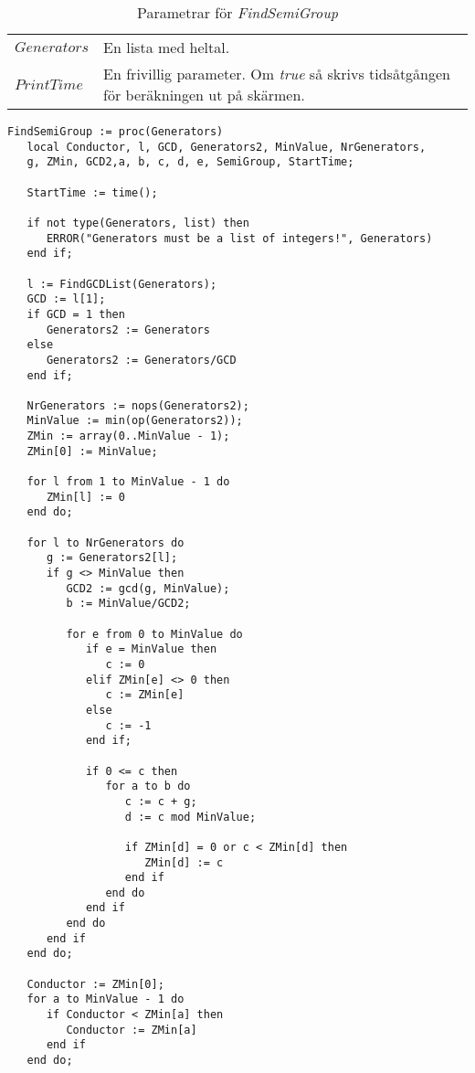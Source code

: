 \begin{table}[h]
\caption{Parametrar för \emph{FindSemiGroup}}
\begin{center}
\begin{tabular}{|l|p{9cm}|}
\hline
$Generators$ & En lista med heltal.\\
$PrintTime$ & En frivillig parameter. Om \emph{true} så skrivs tidsåtgången för beräkningen ut på skärmen.\\
\hline
\end{tabular}
\end{center}
\end{table}

\begin{verbatim}
FindSemiGroup := proc(Generators)
   local Conductor, l, GCD, Generators2, MinValue, NrGenerators, 
   g, ZMin, GCD2,a, b, c, d, e, SemiGroup, StartTime;

   StartTime := time();

   if not type(Generators, list) then
      ERROR("Generators must be a list of integers!", Generators)
   end if;

   l := FindGCDList(Generators);
   GCD := l[1];
   if GCD = 1 then
      Generators2 := Generators
   else
      Generators2 := Generators/GCD
   end if;

   NrGenerators := nops(Generators2);
   MinValue := min(op(Generators2));
   ZMin := array(0..MinValue - 1);
   ZMin[0] := MinValue;

   for l from 1 to MinValue - 1 do
      ZMin[l] := 0
   end do;

   for l to NrGenerators do
      g := Generators2[l];
      if g <> MinValue then
         GCD2 := gcd(g, MinValue);
         b := MinValue/GCD2;

         for e from 0 to MinValue do
            if e = MinValue then
               c := 0
            elif ZMin[e] <> 0 then
               c := ZMin[e]
            else
               c := -1
            end if;

            if 0 <= c then
               for a to b do
                  c := c + g;
                  d := c mod MinValue;

                  if ZMin[d] = 0 or c < ZMin[d] then
                     ZMin[d] := c
                  end if
               end do
            end if
         end do
      end if
   end do;

   Conductor := ZMin[0];
   for a to MinValue - 1 do
      if Conductor < ZMin[a] then
         Conductor := ZMin[a]
      end if
   end do;


\end{verbatim}
